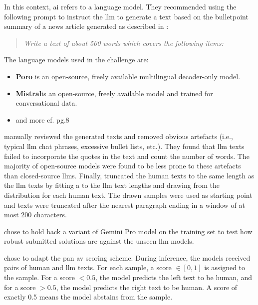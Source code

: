 In this context, \ac{ai} refers to a language model.
They recommended using the following prompt to instruct the \ac{llm} to generate a text 
based on the bulletpoint summary of a news article generated as described in \cite{pan_dataset_authorship_verification}:
\begin{quote}
    \textit{Write a text of about 500 words which covers the following items:}
\end{quote}
The language models used in the challenge are:
\begin{itemize}
    \item \textbf{Poro} is an open-source, freely available multilingual decoder-only model.
    \item \textbf{Mistral}is an open-source, freely available model and trained for conversational data.
    \item and more cf. pg.8 \cite{bevendorff_overview_2024}
\end{itemize}
\citet{bevendorff_overview_2024} manually reviewed the generated texts and removed obvious artefacts 
(i.e., typical \ac{llm} chat phrases, excessive bullet lists, etc.).
They found that \ac{llm} texts failed to incorporate the quotes in the text and count the number of words.
The majority of open-source models were found to be less prone to these artefacts than closed-source \acp{llm}.
Finally, \citet{bevendorff_overview_2024} truncated the human texts to the same length as the \ac{llm} texts by 
fitting a  to the \ac{llm} text lengths and drawing from the distribution for each human text.
The drawn samples were used as starting point and texts were truncated after the nearest paragraph ending in a window of at most 200 characters.

\citet{bevendorff_overview_2024} chose to hold back a variant of Gemini Pro model on the training set to test 
how robust submitted solutions are against the unseen \ac{llm} models.

\citet{bevendorff_overview_2024} chose to adapt the \ac{pan} \ac{av} scoring scheme.
During inference, the models received pairs of human and \ac{llm} texts.
For each sample, a score $\in [0, 1]$ is assigned to the sample.
For a score $<0.5$, the model predicts the left text to be human,
and for a score $>0.5$, the model predicts the right text to be human.
A score of exactly 0.5 means the model abstains from the sample.

